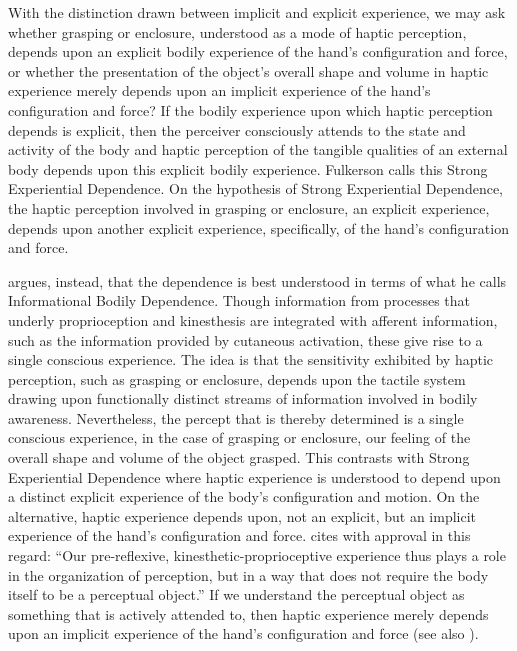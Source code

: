 With the distinction drawn between implicit and explicit experience, we may ask whether grasping or enclosure, understood as a mode of haptic perception, depends upon an explicit bodily experience of the hand's configuration and force, or whether the presentation of the object's overall shape and volume in haptic experience merely depends upon an implicit experience of the hand's configuration and force? If the bodily experience upon which haptic perception depends is explicit, then the perceiver consciously attends to the state and activity of the body and haptic perception of the tangible qualities of an external body depends upon this explicit bodily experience. Fulkerson calls this Strong Experiential Dependence. On the hypothesis of Strong Experiential Dependence, the haptic perception involved in grasping or enclosure, an explicit experience, depends upon another explicit experience, specifically, of the hand's configuration and force.

\citet[chapter 4.8]{Fulkerson:2014ek} argues, instead, that the dependence is best understood in terms of what he calls Informational Bodily Dependence. Though information from processes that underly proprioception and kinesthesis are integrated with afferent information, such as the information provided by cutaneous activation, these give rise to a single conscious experience. The idea is that the sensitivity exhibited by haptic perception, such as grasping or enclosure, depends upon the tactile system drawing upon functionally distinct streams of information involved in bodily awareness. Nevertheless, the percept that is thereby determined is a single conscious experience, in the case of grasping or enclosure, our feeling of the overall shape and volume of the object grasped. This contrasts with Strong Experiential Dependence where haptic experience is understood to depend upon a distinct explicit experience of the body's configuration and motion. On the alternative, haptic experience depends upon, not an explicit, but an implicit experience of the hand's configuration and force. \citet[91]{Fulkerson:2014ek} cites with approval \citet[137]{Gallagher:2005ag} in this regard: ``Our pre-reflexive, kinesthetic-proprioceptive experience thus plays a role in the organization of perception, but in a way that does not require the body itself to be a perceptual object.'' If we understand the perceptual object as something that is actively attended to, then haptic experience merely depends upon an implicit experience of the hand's configuration and force (see also \citealt{Bower:2013aa}).

